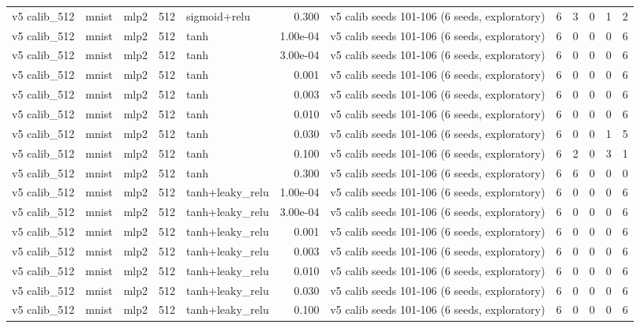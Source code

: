 \begin{table}[htbp]
{\begin{tabular}{@{}lllrlrlrrrrr@{}}
v5 calib\_512 & mnist & mlp2 & 512 & sigmoid+relu & 0.300 & v5 calib seeds 101-106 (6 seeds, exploratory) & 6 & 3 & 0 & 1 & 2 \\
v5 calib\_512 & mnist & mlp2 & 512 & tanh & 1.00e-04 & v5 calib seeds 101-106 (6 seeds, exploratory) & 6 & 0 & 0 & 0 & 6 \\
v5 calib\_512 & mnist & mlp2 & 512 & tanh & 3.00e-04 & v5 calib seeds 101-106 (6 seeds, exploratory) & 6 & 0 & 0 & 0 & 6 \\
v5 calib\_512 & mnist & mlp2 & 512 & tanh & 0.001 & v5 calib seeds 101-106 (6 seeds, exploratory) & 6 & 0 & 0 & 0 & 6 \\
v5 calib\_512 & mnist & mlp2 & 512 & tanh & 0.003 & v5 calib seeds 101-106 (6 seeds, exploratory) & 6 & 0 & 0 & 0 & 6 \\
v5 calib\_512 & mnist & mlp2 & 512 & tanh & 0.010 & v5 calib seeds 101-106 (6 seeds, exploratory) & 6 & 0 & 0 & 0 & 6 \\
v5 calib\_512 & mnist & mlp2 & 512 & tanh & 0.030 & v5 calib seeds 101-106 (6 seeds, exploratory) & 6 & 0 & 0 & 1 & 5 \\
v5 calib\_512 & mnist & mlp2 & 512 & tanh & 0.100 & v5 calib seeds 101-106 (6 seeds, exploratory) & 6 & 2 & 0 & 3 & 1 \\
v5 calib\_512 & mnist & mlp2 & 512 & tanh & 0.300 & v5 calib seeds 101-106 (6 seeds, exploratory) & 6 & 6 & 0 & 0 & 0 \\
v5 calib\_512 & mnist & mlp2 & 512 & tanh+leaky\_relu & 1.00e-04 & v5 calib seeds 101-106 (6 seeds, exploratory) & 6 & 0 & 0 & 0 & 6 \\
v5 calib\_512 & mnist & mlp2 & 512 & tanh+leaky\_relu & 3.00e-04 & v5 calib seeds 101-106 (6 seeds, exploratory) & 6 & 0 & 0 & 0 & 6 \\
v5 calib\_512 & mnist & mlp2 & 512 & tanh+leaky\_relu & 0.001 & v5 calib seeds 101-106 (6 seeds, exploratory) & 6 & 0 & 0 & 0 & 6 \\
v5 calib\_512 & mnist & mlp2 & 512 & tanh+leaky\_relu & 0.003 & v5 calib seeds 101-106 (6 seeds, exploratory) & 6 & 0 & 0 & 0 & 6 \\
v5 calib\_512 & mnist & mlp2 & 512 & tanh+leaky\_relu & 0.010 & v5 calib seeds 101-106 (6 seeds, exploratory) & 6 & 0 & 0 & 0 & 6 \\
v5 calib\_512 & mnist & mlp2 & 512 & tanh+leaky\_relu & 0.030 & v5 calib seeds 101-106 (6 seeds, exploratory) & 6 & 0 & 0 & 0 & 6 \\
v5 calib\_512 & mnist & mlp2 & 512 & tanh+leaky\_relu & 0.100 & v5 calib seeds 101-106 (6 seeds, exploratory) & 6 & 0 & 0 & 0 & 6 \\

\end{tabular}}
\end{table}
